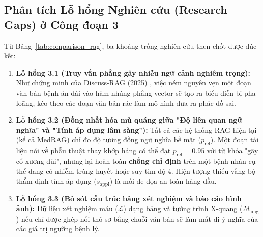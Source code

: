 \clearpage
\subsection{Phân tích Lỗ hổng Nghiên cứu (Research Gaps) ở Công đoạn 3}
Từ Bảng~\ref{tab:comparison_rag}, ba khoảng trống nghiên cứu then chốt được đúc kết:
\begin{enumerate}
    \item \textbf{Lỗ hổng 3.1 (Truy vấn phẳng gây nhiễu ngữ cảnh nghiêm trọng):} Như chứng minh của Discuss-RAG (2025) \cite{dong2025discuss}, việc ném nguyên vẹn một đoạn văn bản bệnh án dài vào hàm nhúng phẳng vector sẽ tạo ra biểu diễn bị pha loãng, kéo theo các đoạn văn bản rác làm mô hình đưa ra phác đồ sai.
    \item \textbf{Lỗ hổng 3.2 (Đồng nhất hóa mù quáng giữa "Độ liên quan ngữ nghĩa" và "Tính áp dụng lâm sàng"):} Tất cả các hệ thống RAG hiện tại (kể cả MedRAG) chỉ đo độ tương đồng ngữ nghĩa bề mặt ($p_{\mathrm{rel}}$). Một đoạn tài liệu nói về phẫu thuật thay khớp háng có thể đạt $p_{\mathrm{rel}} = 0.95$ với từ khóa "gãy cổ xương đùi", nhưng lại hoàn toàn \textbf{chống chỉ định} trên một bệnh nhân cụ thể đang có nhiễm trùng huyết hoặc suy tim độ 4. Hiện tượng thiếu vắng bộ thẩm định tính áp dụng ($s_{\mathrm{appl}}$) là mối đe dọa an toàn hàng đầu.
    \item \textbf{Lỗ hổng 3.3 (Bỏ sót cấu trúc bảng xét nghiệm và báo cáo hình ảnh):} Dữ liệu xét nghiệm máu ($\mathcal{L}$) dạng bảng và tường trình X-quang ($\mathcal{M}_{\mathrm{img}}$) nếu chỉ được ghép nối thô sơ bằng chuỗi văn bản sẽ làm mất đi ý nghĩa của các giá trị ngưỡng bệnh lý.
\end{enumerate}

